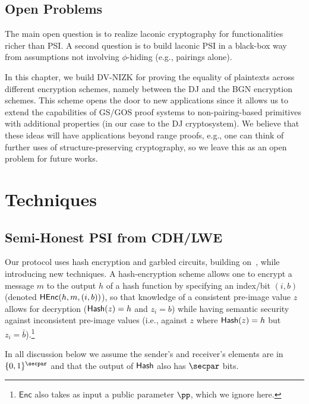 \subsection{Open Problems}
The main open question is to realize laconic cryptography for functionalities richer than PSI. A second question is to build laconic PSI in a black-box way from assumptions not involving $\phi$-hiding (e.g., pairings alone). 


In this chapter, we build DV-NIZK for proving the equality of plaintexts across different encryption schemes, namely between the DJ \cite{PKC:DamJur01} and the BGN \cite{TCC:BonGohNis05,EC:GroOstSah06} encryption schemes. This scheme opens the door to new applications since it allows us to extend the capabilities of GS/GOS proof systems \cite{EC:GroOstSah06,EC:GroSah08} to non-pairing-based primitives with additional properties (in our case to the DJ cryptosystem). We believe that these ideas will have applications beyond range proofs, e.g., one can think of further uses of structure-preserving cryptography, so we leave this as an open problem for future works.

\section{Techniques}
\label{sec:overview}

\def \pick{\leftarrow_\$}
\def \Ext{\mathsf{Ext}}
\def \Enc{\mathsf{Enc}}

\subsection{Semi-Honest PSI from CDH/LWE} Our protocol uses hash encryption and garbled circuits, building on~\cite{C:DotGar17,EC:BLSV18,TCC:GHMR18}, while introducing new techniques. A hash-encryption scheme allows one to encrypt a message $m$ to the output $h$ of a hash function by specifying an index/bit $(i,b)$ (denoted $\mathsf{HEnc}(h,m, (i,b))$), so that knowledge of a consistent pre-image value  $z$ allows for decryption  ($\mathsf{Hash}(z) = h$ and $z_i = b$)  while having semantic security against inconsistent pre-image values (i.e., against $z$ where $\mathsf{Hash}(z) = h$ but $z_i = \bar{b}$).\footnote{$\Enc$ also takes as input a public parameter $\pp$, which we ignore here.}

In all discussion below we assume the sender's and receiver's elements are in $\bits^\secpar$ and that the output of $\mathsf{Hash}$  also has $\secpar$ bits.


